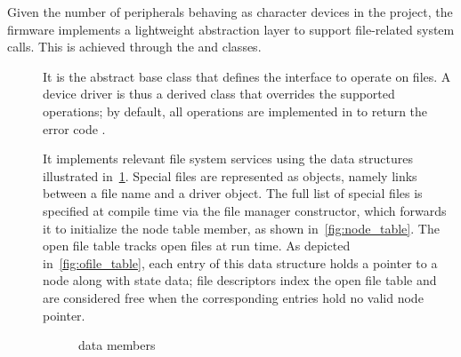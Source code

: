 Given the number of peripherals behaving as character devices in the project, the firmware implements a lightweight abstraction layer to support file-related system calls. This is achieved through the  and  classes.
\begin{description}
    \item[] It is the abstract base class that defines the interface to operate on files. A device driver is thus a derived class that overrides the supported operations; by default, all operations are implemented in  to return the error code .
    
    \item[] It implements relevant file system services using the data structures illustrated in~\cref{fig:fm_datastr}.
    Special files are represented as  objects, namely links between a file name and a driver object. The full list of special files is specified at compile time via the file manager constructor, which forwards it to initialize the node table member, as shown in~\cref{fig:node_table}.
    The open file table tracks open files at run time. As depicted in~\cref{fig:ofile_table}, each entry of this data structure holds a pointer to a node along with state data; file descriptors index the open file table and are considered free when the corresponding entries hold no valid node pointer.
    
    \begin{figure}
      \centering
      \qquad
      \caption{ data members}
      \label{fig:fm_datastr}
    \end{figure}
    

\end{description}
